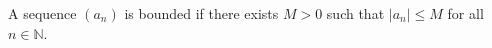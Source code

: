 A sequence $(a_{n})$ is bounded if there exists $M > 0$ such that $\lvert a_{n} \rvert \leq M$ for all $n \in \mathbb{N}$.